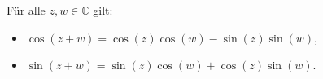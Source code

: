 Für alle $z, w \in \mathbb{C}$ gilt:
\begin{itemize}
    \item $\cos(z+w) = \cos(z) \cos(w) - \sin(z) \sin(w)$,  
    \item $\sin(z+w) = \sin(z) \cos(w) + \cos(z) \sin(w)$.
\end{itemize} 